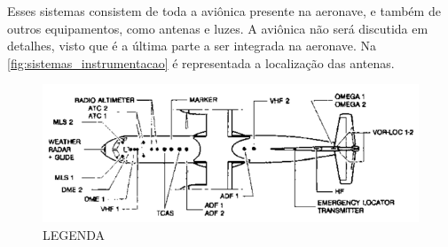 Esses sistemas consistem de toda a aviônica presente na aeronave, e também de outros equipamentos, como antenas e luzes.
A aviônica não será discutida em detalhes, visto que é a última parte a ser integrada na aeronave.
Na \autoref{fig:sistemas_instrumentacao} é representada a localização das antenas.

\begin{figure}
\centering
\includegraphics{images/parte3/sistemas_instrumentacao.png}
\caption{LEGENDA}
\label{fig:sistemas_instrumentacao}
\end{figure}
